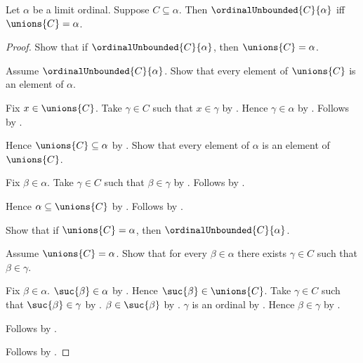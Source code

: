 \begin{proposition}\label{ordinal_unbounded_iff_union}
    Let $\alpha$ be a limit ordinal.
    Suppose $C\subseteq\alpha$.
    Then $\ordinalUnbounded{C}{\alpha}$ iff $\unions{C}=\alpha$.
\end{proposition}
\begin{proof}
    Show that if $\ordinalUnbounded{C}{\alpha}$, then
        $\unions{C}=\alpha$.
    \begin{subproof}
        Assume $\ordinalUnbounded{C}{\alpha}$.
        Show that every element of $\unions{C}$ is an element of $\alpha$.
        \begin{subproof}
            Fix $x\in\unions{C}$.
            Take $\gamma\in C$ such that $x\in\gamma$
                by .
            Hence $\gamma\in\alpha$ by .
            Follows by .
        \end{subproof}
        Hence $\unions{C}\subseteq\alpha$ by .
        Show that every element of $\alpha$ is an element of $\unions{C}$.
        \begin{subproof}
            Fix $\beta\in\alpha$.
            Take $\gamma\in C$ such that $\beta\in\gamma$
                by .
            Follows by .
        \end{subproof}
        Hence $\alpha\subseteq\unions{C}$ by .
        Follows by .
    \end{subproof}
    Show that if $\unions{C}=\alpha$, then
        $\ordinalUnbounded{C}{\alpha}$.
    \begin{subproof}
        Assume $\unions{C}=\alpha$.
        Show that for every $\beta\in\alpha$ there exists $\gamma\in C$
            such that $\beta\in\gamma$.
        \begin{subproof}
            Fix $\beta\in\alpha$.
            $\suc{\beta}\in\alpha$ by .
            Hence $\suc{\beta}\in\unions{C}$.
            Take $\gamma\in C$ such that $\suc{\beta}\in\gamma$
                by .
            $\beta\in\suc{\beta}$ by .
            $\gamma$ is an ordinal
                by .
            Hence $\beta\in\gamma$ by .
        \end{subproof}
        Follows by .
    \end{subproof}
    Follows by \auto.
\end{proof}

